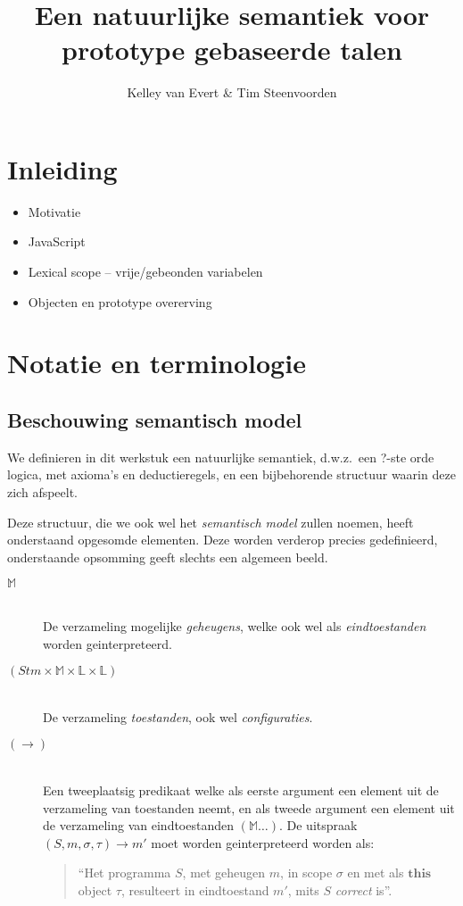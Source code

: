 \documentclass
  [11pt,
   paper=a4,
   cleardouble=plain,
   chapterprefix=true,
   parskip=half]
  {scrbook}
\newcommand{\<}
  {\ensuremath{\langle}}
\renewcommand{\>}
  {\ensuremath{\rangle}}
\begin{document}
\title{Een natuurlijke semantiek voor prototype gebaseerde talen}
\author{Kelley van Evert \& Tim Steenvoorden}
\maketitle

\frontmatter

\tableofcontents

\mainmatter

\chapter{Inleiding}

\begin{itemize}
	\item Motivatie
	\item JavaScript
	\item Lexical scope -- vrije/gebeonden variabelen
	\item Objecten en prototype overerving
\end{itemize}

\chapter{Notatie en terminologie}

\section{Beschouwing semantisch model}

We definieren in dit werkstuk een natuurlijke semantiek, d.w.z.~een ?-ste orde logica, met axioma's en deductieregels, en een bijbehorende structuur waarin deze zich afspeelt.

Deze structuur, die we ook wel het \emph{semantisch model} zullen noemen, heeft onderstaand opgesomde elementen. Deze worden verderop precies gedefinieerd, onderstaande opsomming geeft slechts een algemeen beeld.

\begin{description}
	\item[$\mathbb{M}$]\hfill\\ De verzameling mogelijke \emph{geheugens}, welke ook wel als \emph{eindtoestanden} worden geinterpreteerd.
	\item[$(\mathit{Stm} \times \mathbb{M} \times \mathbb{L} \times \mathbb{L})$]\hfill\\ De verzameling \emph{toestanden}, ook wel \emph{configuraties}.
	\item[$(\longrightarrow)$]\hfill\\ Een tweeplaatsig predikaat welke als eerste argument een element uit de verzameling van toestanden neemt, en als tweede argument een element uit de verzameling van eindtoestanden $(\mathbb{M}\dots)$. De uitspraak $(S, m, \sigma, \tau) \longrightarrow m'$ moet worden geinterpreteerd worden als:
	\begin{quote} ``Het programma $S$, met geheugen $m$, in scope $\sigma$ en met als $\mathbf{this}$ object $\tau$, resulteert in eindtoestand $m'$, mits $S$ \emph{correct} is''. \end{quote}
\end{description}
\end{document}
